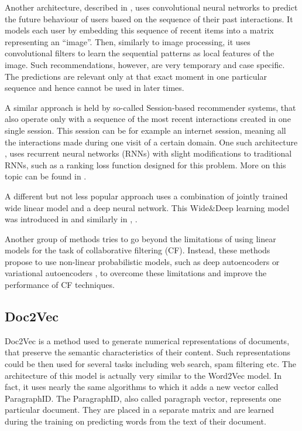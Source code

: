Another architecture, described in \cite{Convolutional}, uses convolutional neural networks to predict the future behaviour of users based on the sequence of their past interactions. It models each user by embedding this sequence of recent items into a matrix representing an “image”. Then, similarly to image processing, it uses convolutional filters to learn the sequential patterns as local features of the image. Such recommendations, however, are very temporary and case specific. The predictions are relevant only at that exact moment in one particular sequence and hence cannot be used in later times. 

A similar approach is held by so-called Session-based recommender systems, that also operate only with a sequence of the most recent interactions created in one single session. This session can be for example an internet session, meaning all the interactions made during one visit of a certain domain. One such architecture \cite{Session-based}, uses recurrent neural networks (RNNs) with slight modifications to traditional RNNs, such as a ranking loss function designed for this problem. More on this topic can be found in \cite{Session-based_Survey}. 

A different but not less popular approach uses a combination of jointly trained wide linear model and a deep neural network. This Wide\&Deep learning model was introduced in \cite{Wide&Deep} and similarly in \cite{DeepFM}, \cite{xDeepFM}. 

Another group of methods tries to go beyond the limitations of using linear models for the task of collaborative filtering (CF). Instead, these methods propose to use non-linear probabilistic models, such as deep autoencoders \cite{Autoencoder} or variational autoencoders \cite{vae_for_cf}, to overcome these limitations and improve the performance of CF techniques.

\subsection*{Doc2Vec} \label{doc2vec_description}
Doc2Vec is a method used to generate numerical representations of documents, that preserve the semantic characteristics of their content. Such representations could be then used for several tasks including web search, spam filtering etc. The architecture of this model is actually very similar to the Word2Vec model. In fact, it uses nearly the same algorithms to which it adds a new vector called ParagraphID. The ParagraphID, also called paragraph vector, represents one particular document. They are placed in a separate matrix and are learned during the training on predicting words from the text of their document. 

